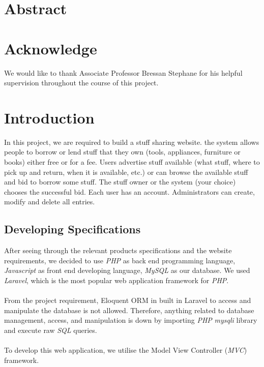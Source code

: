 \section*{Abstract}
\newpage

\section*{Acknowledge}
We would like to thank Associate Professor Bressan Stephane for his helpful supervision
throughout the course of this project.
\newpage
\tableofcontents
\newpage

\section{Introduction}
In this project, we are required to build a stuff sharing website. the system allows people to borrow or lend stuff that they own (tools, appliances, furniture or books) either free or for a fee. Users advertise stuff available (what stuff, where to pick up and return, when it is available, etc.) or can browse the available stuff and bid to borrow some stuff. The stuff owner or the system (your choice) chooses the successful bid. Each user has an account. Administrators can create, modify and delete all entries.
\subsection{Developing Specifications}

After seeing through the relevant products specifications and the website requirements, we decided to use \textit{PHP} as back end programming language, \textit{Javascript} as front end developing language, \textit{MySQL} as our database. We used \textit{Laravel}, which is the most popular web application framework for \textit{PHP}.\\
\\
From the project requirement, Eloquent ORM in built in Laravel to access and manipulate the database is not allowed. Therefore, anything related to database management, access, and manipulation is down by importing \textit{PHP} \textit{mysqli} library and execute raw \textit{SQL} queries.\\
\\
To develop this web application, we utilise the Model View Controller (\textit{MVC}) framework.\\

